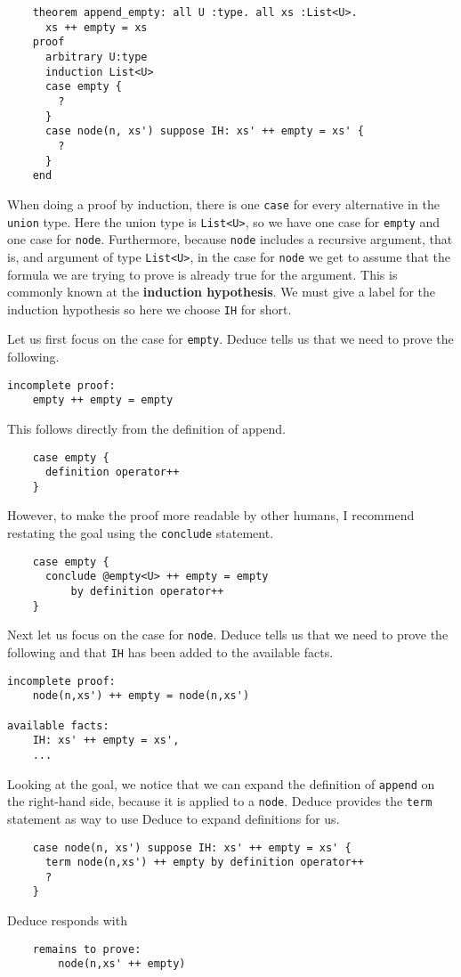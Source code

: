 \documentclass[12pt]{article}
\begin{document}
\begin{verbatim}
    theorem append_empty: all U :type. all xs :List<U>.
      xs ++ empty = xs
    proof
      arbitrary U:type
      induction List<U>
      case empty {
        ?
      }
      case node(n, xs') suppose IH: xs' ++ empty = xs' {
        ?
      }
    end
\end{verbatim}

When doing a proof by induction, there is one \texttt{case} for every
alternative in the \texttt{union} type. Here the union type is
\texttt{List<U>}, so we have one case for \texttt{empty} and one case
for \texttt{node}.  Furthermore, because \texttt{node} includes a
recursive argument, that is, and argument of type \texttt{List<U>}, in
the case for \texttt{node} we get to assume that the formula we are
trying to prove is already true for the argument. This is commonly
known at the \textbf{induction hypothesis}.  We must give a label for
the induction hypothesis so here we choose \texttt{IH} for short.

Let us first focus on the case for \texttt{empty}. Deduce tells us that we
need to prove the following.

\begin{verbatim}
incomplete proof:
    empty ++ empty = empty
\end{verbatim}
This follows directly from the definition of append.
\begin{verbatim}
    case empty {
      definition operator++
    }
\end{verbatim}
However, to make the proof more readable by other humans, I recommend
restating the goal using the \texttt{conclude} statement.
\begin{verbatim}
    case empty {
      conclude @empty<U> ++ empty = empty
          by definition operator++
    }
\end{verbatim}

Next let us focus on the case for \texttt{node}. Deduce tells us that
we need to prove the following and that \texttt{IH} has been added to
the available facts.
\begin{verbatim}
incomplete proof:
    node(n,xs') ++ empty = node(n,xs')

available facts:
    IH: xs' ++ empty = xs',
    ...
\end{verbatim}
Looking at the goal, we notice that we can expand the definition of
\texttt{append} on the right-hand side, because it is applied to a
\texttt{node}.  Deduce provides the \texttt{term} statement as way to
use Deduce to expand definitions for us.
\begin{verbatim}
    case node(n, xs') suppose IH: xs' ++ empty = xs' {
      term node(n,xs') ++ empty by definition operator++
      ?
    }
\end{verbatim}
Deduce responds with
\begin{verbatim}
    remains to prove:
        node(n,xs' ++ empty)
\end{verbatim}
\end{document}
